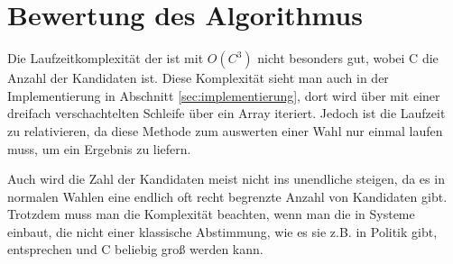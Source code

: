 \section{Bewertung des Algorithmus}
\label{sec:Bewertung2}

Die Laufzeitkomplexität der \schulze ist mit $O(C^3)$ nicht besonders gut, wobei C die Anzahl der Kandidaten ist. Diese Komplexität sieht man auch in der Implementierung in Abschnitt \ref{sec:implementierung}, dort wird über mit einer dreifach verschachtelten Schleife über ein Array iteriert. Jedoch ist die Laufzeit zu relativieren, da diese Methode zum auswerten einer Wahl nur einmal laufen muss, um ein Ergebnis zu liefern.

Auch wird die Zahl der Kandidaten meist nicht ins unendliche steigen, da es in normalen Wahlen eine endlich oft recht begrenzte Anzahl von Kandidaten gibt. Trotzdem muss man die Komplexität beachten, wenn man die \schulze in Systeme einbaut, die nicht einer klassische Abstimmung, wie es sie z.B. in Politik gibt, entsprechen und C beliebig groß werden kann.


